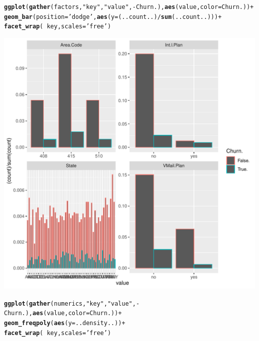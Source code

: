 \documentclass{article}\usepackage[]{graphicx}\usepackage[]{color}
\makeatletter
\def\maxwidth{ %
  \ifdim\Gin@nat@width>\linewidth
    \linewidth
  \else
    \Gin@nat@width
  \fi
}
\newcommand{\hlstr}[1]{\textcolor[rgb]{0.192,0.494,0.8}{#1}}%
\newcommand{\hlopt}[1]{\textcolor[rgb]{0,0,0}{#1}}%
\newcommand{\hlstd}[1]{\textcolor[rgb]{0.345,0.345,0.345}{#1}}%
\newcommand{\hlkwc}[1]{\textcolor[rgb]{0.333,0.667,0.333}{#1}}%
\newcommand{\hlkwd}[1]{\textcolor[rgb]{0.737,0.353,0.396}{\textbf{#1}}}%
\newenvironment{kframe}{%
 \def\at@end@of@kframe{}%
 \ifinner\ifhmode%
  \def\at@end@of@kframe{\end{minipage}}%
  \begin{minipage}{\columnwidth}%
 \fi\fi%
 \def\FrameCommand##1{\hskip\@totalleftmargin \hskip-\fboxsep
 \colorbox{shadecolor}{##1}\hskip-\fboxsep
     \hskip-\linewidth \hskip-\@totalleftmargin \hskip\columnwidth}%
 \MakeFramed {\advance\hsize-\width
   \@totalleftmargin\z@ \linewidth\hsize
   \@setminipage}}%
 {\par\unskip\endMakeFramed%
 \at@end@of@kframe}
\newenvironment{knitrout}{}{} %
\makeatother
\begin{document}
\begin{description}
\begin{knitrout}
\color{fgcolor}\begin{kframe}
\begin{alltt}
\hlkwd{ggplot}\hlstd{(}\hlkwd{gather}\hlstd{(factors,} \hlstr{"key"}\hlstd{,} \hlstr{"value"}\hlstd{,} \hlopt{-}\hlstd{Churn.),} \hlkwd{aes}\hlstd{(value,} \hlkwc{color}\hlstd{=Churn.))} \hlopt{+}
  \hlkwd{geom_bar}\hlstd{(}\hlkwc{position}\hlstd{=}\hlstr{'dodge'}\hlstd{,} \hlkwd{aes}\hlstd{(}\hlkwc{y}\hlstd{=(..count..)}\hlopt{/}\hlkwd{sum}\hlstd{(..count..)))} \hlopt{+}
  \hlkwd{facet_wrap}\hlstd{(}\hlopt{~}\hlstd{key,} \hlkwc{scales}\hlstd{=}\hlstr{'free'}\hlstd{)}
\end{alltt}
\end{kframe}
\includegraphics[width=\maxwidth]{figure/Overviews_plots_grouped-1} 
\begin{kframe}\begin{alltt}
\hlkwd{ggplot}\hlstd{(}\hlkwd{gather}\hlstd{(numerics,} \hlstr{"key"}\hlstd{,} \hlstr{"value"}\hlstd{,} \hlopt{-}\hlstd{Churn.),} \hlkwd{aes}\hlstd{(value,} \hlkwc{color}\hlstd{=Churn.))} \hlopt{+}
  \hlkwd{geom_freqpoly}\hlstd{(}\hlkwd{aes}\hlstd{(}\hlkwc{y}\hlstd{=..density..))} \hlopt{+}
  \hlkwd{facet_wrap}\hlstd{(}\hlopt{~}\hlstd{key,} \hlkwc{scales}\hlstd{=}\hlstr{'free'}\hlstd{)}
\end{alltt}

\end{kframe}
\end{knitrout}
\end{description}
\end{document}
